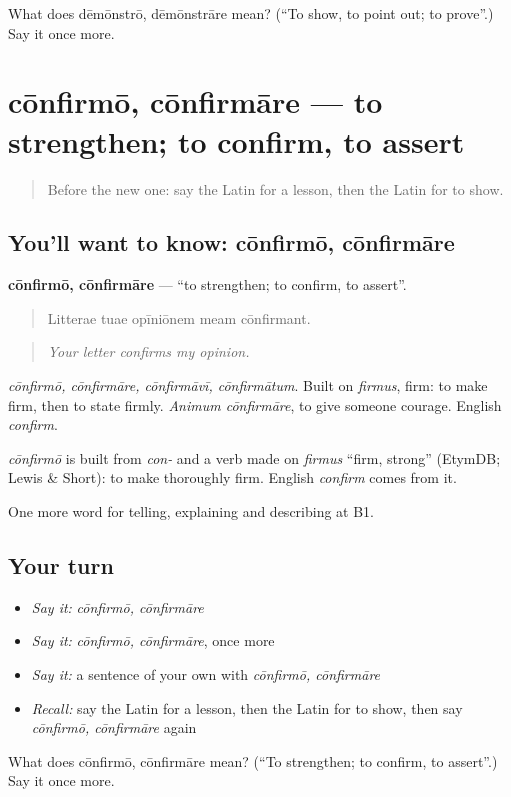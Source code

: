 \begin{tcolorbox}[breakable,colback=teal!4,colframe=teal!35!black,title={Before you move on}]
What does dēmōnstrō, dēmōnstrāre mean? (\textquotedblleft{}To show, to point out; to prove\textquotedblright{}.) Say it once more.
\end{tcolorbox}
\section[cōnfirmō, cōnfirmāre]{cōnfirmō, cōnfirmāre — to strengthen; to confirm, to assert}

\label{lesson:LA-C361-confirmo}



\begin{quote}
Before the new one: say the Latin for a lesson, then the Latin for to show.
\end{quote}

\subsection*{You'll want to know: cōnfirmō, cōnfirmāre}
\textbf{cōnfirmō, cōnfirmāre} — \textquotedblleft{}to strengthen; to confirm, to assert\textquotedblright{}.

\begin{quote}
Litterae tuae opīniōnem meam cōnfirmant.
\end{quote}

\begin{quote}
\emph{Your letter confirms my opinion.}
\end{quote}

\emph{cōnfirmō, cōnfirmāre, cōnfirmāvī, cōnfirmātum}. Built on \emph{firmus}, firm: to make firm, then to state firmly. \emph{Animum cōnfirmāre}, to give someone courage. English \emph{confirm}.

\begin{cousinweb}
\emph{cōnfirmō} is built from \emph{con-} and a verb made on \emph{firmus} \textquotedblleft{}firm, strong\textquotedblright{} (EtymDB; Lewis \& Short): to make thoroughly firm. English \emph{confirm} comes from it.
\end{cousinweb}

\begin{grammarlens}[title={What you've built}]
One more word for telling, explaining and describing at B1.
\end{grammarlens}

\subsection*{Your turn}
\begin{itemize}
\raggedright
  \item \emph{Say it:} \emph{cōnfirmō, cōnfirmāre}
  \item \emph{Say it:} \emph{cōnfirmō, cōnfirmāre}, once more
  \item \emph{Say it:} a sentence of your own with \emph{cōnfirmō, cōnfirmāre}
  \item \emph{Recall:} say the Latin for a lesson, then the Latin for to show, then say \emph{cōnfirmō, cōnfirmāre} again
\end{itemize}

\begin{tcolorbox}[breakable,colback=teal!4,colframe=teal!35!black,title={Before you move on}]
What does cōnfirmō, cōnfirmāre mean? (\textquotedblleft{}To strengthen; to confirm, to assert\textquotedblright{}.) Say it once more.
\end{tcolorbox}
